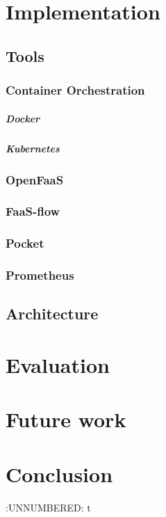 \documentclass[12pt,titlepage]{article}
\begin{document}
\section{Implementation}
\label{sec:org46719c9}
\subsection{Tools}
\label{sec:orga41c270}
\subsubsection{Container Orchestration}
\label{sec:org8ff1f3c}
\subparagraph{Docker}
\label{sec:orga2e53d8}
\subparagraph{Kubernetes}
\label{sec:orge6fd97b}
\subsubsection{OpenFaaS}
\label{sec:org2a9315b}
\subsubsection{FaaS-flow}
\label{sec:orgf31d138}
\subsubsection{Pocket}
\label{sec:orgcdfda39}
\subsubsection{Prometheus}
\label{sec:org8324249}
\subsection{Architecture}
\label{sec:org42b222d}
\section{Evaluation}
\label{sec:org3c9e3f7}
\section{Future work}
\label{sec:org48cb3ef}
\section{Conclusion}
\label{sec:orgabaa607}


:UNNUMBERED: t
\end{document}
